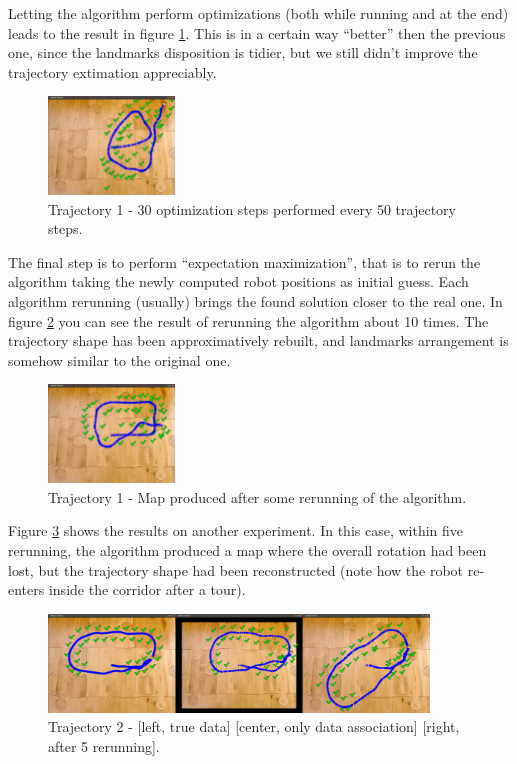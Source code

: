 Letting the algorithm perform optimizations (both while running and at the end) leads to the result in figure \ref{fig:corridor_optim}. This is in a certain way ``better'' then the previous one, since the landmarks disposition is tidier, but we still didn't improve the trajectory extimation appreciably.
\begin{figure}[htbp]
  \centering
    \includegraphics[width=0.3\textwidth]{images/corridor/corridor_optim.png}
  \caption{Trajectory 1 - 30 optimization steps performed every 50 trajectory steps.}
  \label{fig:corridor_optim}
\end{figure}

The final step is to perform ``expectation maximization'', that is to rerun the algorithm taking the newly computed robot positions as initial guess. Each algorithm rerunning (usually) brings the found solution closer to the real one. In figure \ref{fig:corridor_em} you can see the result of rerunning the algorithm about 10 times. The trajectory shape has been approximatively rebuilt, and landmarks arrangement is somehow similar to the original one.
\begin{figure}[htbp]
  \centering
    \includegraphics[width=0.3\textwidth]{images/corridor/corridor_rerun10.png}
  \caption{Trajectory 1 - Map produced after some rerunning of the algorithm.}
  \label{fig:corridor_em}
\end{figure}

Figure \ref{fig:corridor2} shows the results on another experiment. In this case, within five rerunning, the algorithm produced a map where the overall rotation had been lost, but the trajectory shape had been reconstructed (note how the robot re-enters inside the corridor after a tour).
\begin{figure}[htbp]
  \centering
    \includegraphics[width=0.9\textwidth]{images/corridor/corridor2.png}
  \caption{Trajectory 2 - [left, true data] [center, only data association] [right, after 5 rerunning].}
  \label{fig:corridor2}
\end{figure}
